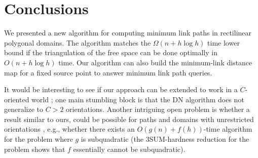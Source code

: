 \documentclass[english,runningheads,11pt]{llncs-revised}
\begin{document}
\section{Conclusions}
\label{sec:conclude}

We presented a new algorithm for computing minimum
link paths in rectilinear polygonal domains. The algorithm
matches the $\Omega(n+h\log h)$ time lower bound \cite{ref:MaheshwariLi00}
if the triangulation of the free space can be done optimally in $O(n+h\log h)$ time.
Our algorithm can also build the minimum-link distance map for a fixed source point to answer minimum link
path queries.


It would be interesting to see if our approach can be extended to work in a $C$-oriented world \cite{ref:AdegeestMi94,ref:HershbergerCo94,ref:MitchellMi14}; one main stumbling block is that the DN algorithm does not generalize to $C>2$ orientations. Another intriguing open problem is whether a result similar to ours, could be possible for paths and domains with unrestricted orientations \cite{ref:MitchellMi92}, e.g., whether there exists an $O(g(n)+f(h))$-time algorithm for the problem where $g$ is subquadratic (the 3SUM-hardness reduction \cite{ref:MitchellMi14} for the problem shows that $f$ essentially cannot be subquadratic).














\end{document}
